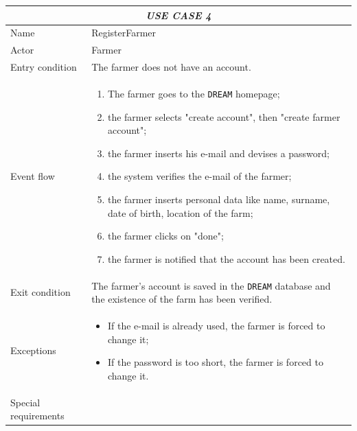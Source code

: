 \documentclass{article}
\begin{document}
\centering
\begin{longtable}{|p{3.5cm}|m{8cm}|}
 \hline
 \multicolumn{2}{|c|}{\cellcolor{white}\emph{USE CASE 4}} \\
 \endfirsthead
 \endhead
 \endfoot
 \endlastfoot
 \hline
 Name & RegisterFarmer\\
 \hline
 Actor & Farmer\\
 \hline
 Entry condition & The farmer does not have an account.\\
 \hline
 Event flow & \begin{enumerate}
    \item The farmer goes to the \verb|DREAM| homepage;
    \item the farmer selects "create account", then "create farmer account";
    \item the farmer inserts his e-mail and devises a password;
    \item the system verifies the e-mail of the farmer;
    \item the farmer inserts personal data like name, surname, date of birth, location of the farm;
    \item the farmer clicks on "done";
    \item the farmer is notified that the account has been created.
 \end{enumerate}\\
 \hline
 Exit condition & The farmer's account is saved in the \verb|DREAM| database and the existence of the farm has been verified.\\
 \hline
 Exceptions & \begin{itemize}
     \item If the e-mail is already used, the farmer is forced to change it;
     \item If the password is too short, the farmer is forced to change it.
 \end{itemize}\\
 \hline
 Special requirements &  \\
 \hline
\end{longtable}
\end{document}
